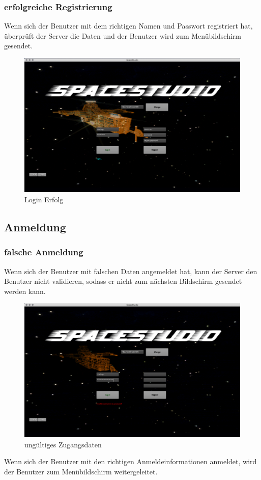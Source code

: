 \documentclass[11pt]{article}
\begin{document}
\subsubsection{erfolgreiche  Registrierung}
Wenn sich der Benutzer mit dem richtigen Namen und Passwort registriert hat, überprüft der Server die Daten und der Benutzer wird zum Menübildschirm gesendet.\\

\begin{figure}[h]
\centering
\includegraphics[scale=0.3]{TestProtocolBilder/erfolgLogin.png}
\caption{Login Erfolg}
\end{figure}
\newpage
\subsection{Anmeldung}
\subsubsection{ falsche Anmeldung}
Wenn sich der Benutzer mit falschen Daten angemeldet hat, kann der Server den Benutzer nicht validieren, sodass er nicht zum nächsten Bildschirm gesendet werden kann.
\begin{figure}[h]
\centering
\includegraphics[scale=0.3]{TestProtocolBilder/invalidCredentials.png}
\caption{ungültiges Zugangsdaten}
\end{figure}
\newpage
Wenn sich der Benutzer mit den richtigen Anmeldeinformationen anmeldet, wird der Benutzer zum Menübildschirm weitergeleitet.\\
\end{document}
